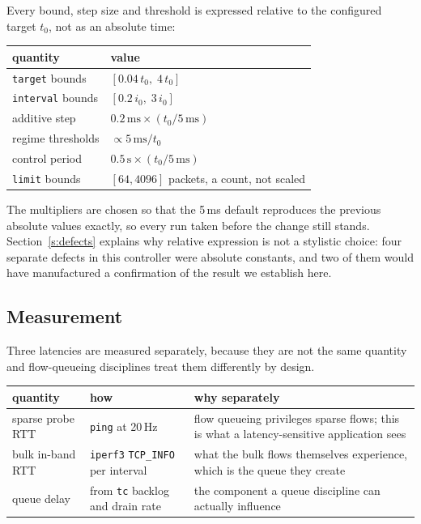 \documentclass[11pt,a4paper]{article}
\begin{document}
Every bound, step size and threshold is expressed relative to the configured
target $t_0$, not as an absolute time:

\begin{center}\small
\begin{tabular}{ll}
\toprule
quantity & value \\ \midrule
\texttt{target} bounds & $[0.04\,t_0,\;4\,t_0]$ \\
\texttt{interval} bounds & $[0.2\,i_0,\;3\,i_0]$ \\
additive step & $0.2\,\mathrm{ms}\times(t_0/5\,\mathrm{ms})$ \\
regime thresholds & $\propto 5\,\mathrm{ms}/t_0$ \\
control period & $0.5\,\mathrm{s}\times(t_0/5\,\mathrm{ms})$ \\
\texttt{limit} bounds & $[64,4096]$ packets, a count, not scaled \\
\bottomrule
\end{tabular}
\end{center}

The multipliers are chosen so that the 5\,ms default reproduces the previous
absolute values exactly, so every run taken before the
change still stands. Section~\ref{s:defects} explains why relative expression is
not a stylistic choice: four separate defects in this controller were absolute
constants, and two of them would have manufactured a confirmation of the
result we establish here.

\subsection{Measurement}

Three latencies are measured separately, because they are not the same
quantity and flow-queueing disciplines treat them differently by design.

\begin{center}\small
\begin{tabular}{p{3.1cm}p{4.6cm}p{6.4cm}}
\toprule
quantity & how & why separately \\ \midrule
sparse probe RTT & \texttt{ping} at 20\,Hz & flow queueing privileges sparse
flows; this is what a latency-sensitive application sees \\
bulk in-band RTT & \texttt{iperf3} \texttt{TCP\_INFO} per interval & what the
bulk flows themselves experience, which is the queue they create \\
queue delay & from \texttt{tc} backlog and drain rate & the component a queue
discipline can actually influence \\
\bottomrule
\end{tabular}
\end{center}
\end{document}
